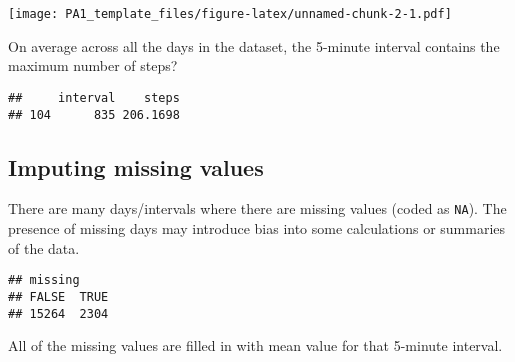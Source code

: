 \documentclass[
]{article}
\newenvironment{Shaded}{\begin{snugshade}}{\end{snugshade}}
\newcommand{\CommentTok}[1]{\textcolor[rgb]{0.56,0.35,0.01}{\textit{#1}}}
\newcommand{\FunctionTok}[1]{\textcolor[rgb]{0.00,0.00,0.00}{#1}}
\newcommand{\NormalTok}[1]{#1}
\newcommand{\OtherTok}[1]{\textcolor[rgb]{0.56,0.35,0.01}{#1}}
\newcommand{\SpecialCharTok}[1]{\textcolor[rgb]{0.00,0.00,0.00}{#1}}
\begin{document}
\texttt{[image: PA1\_template\_files/figure-latex/unnamed-chunk-2-1.pdf]}

On average across all the days in the dataset, the 5-minute interval
contains the maximum number of steps?

\begin{Shaded}
\end{Shaded}

\begin{verbatim}
##     interval    steps
## 104      835 206.1698
\end{verbatim}

\hypertarget{imputing-missing-values}{%
\subsection{Imputing missing values}\label{imputing-missing-values}}

There are many days/intervals where there are missing values (coded as
\texttt{NA}). The presence of missing days may introduce bias into some
calculations or summaries of the data.

\begin{Shaded}
\end{Shaded}

\begin{verbatim}
## missing
## FALSE  TRUE 
## 15264  2304
\end{verbatim}

All of the missing values are filled in with mean value for that
5-minute interval.
\end{document}
